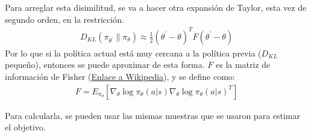 Para arreglar esta disimilitud, se va a hacer otra expansión de Taylor, esta vez de segundo
orden, en la
restricción.
\begin{align}
    \label{eq:expansionsegundoorden}
D _ { KL } ( \pi _ { \theta ^ { \prime } } \| \pi _ { \theta } ) \approx \frac { 1 } { 2 } ( \theta ^ { \prime } - \theta ) ^ { T } F ( \theta ^ { \prime } - \theta )
\end{align}
Por lo que si la política actual está muy cercana a la política previa ($D_{KL}$ pequeño),
entonces se puede aproximar de esta forma. $F$ es la matriz de información de Fisher
(\href{https://en.wikipedia.org/wiki/Fisher_information}{Enlace a Wikipedia}), y se
define como:
\begin{align}
F = E _ { \pi _ { \theta } } [ \nabla _ { \theta } \operatorname { log } \pi _ { \theta } ( a | s ) \nabla _ { \theta } \operatorname { log } \pi _ { \theta } ( a | s ) ^ { T } ]
\end{align}

Para calcularla, se pueden usar las mismas muestras que se usaron para estimar el objetivo.

